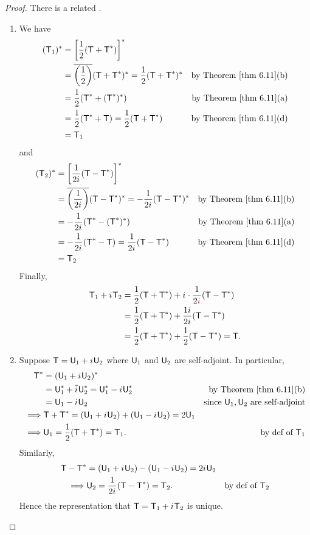 \begin{proof}
There is a related .
\begin{enumerate}
\item
We have
\begin{align*}
    (\T_1)^* & = \left[ \frac{1}{2}(\T + \T^*) \right]^* \\
        & = \conjugatet{\left(\frac{1}{2}\right)} (\T + \T^*)^* = \frac{1}{2} (\T + \T^*)^*& \text{by \THM{6.11}(b)} \\
        & = \frac{1}{2} (\T^* + (\T^*)^*) & \text{by \THM{6.11}(a)} \\
        & = \frac{1}{2} (\T^* + \T) = \frac{1}{2} (\T + \T^*) & \text{by \THM{6.11}(d)} \\
        & = \T_1
\end{align*}
and
\begin{align*}
    (\T_2)^* & = \left[ \frac{1}{2\iu}(\T - \T^*) \right]^* \\
        & = \conjugatet{\left(\frac{1}{2\iu}\right)} (\T - \T^*)^* = -\frac{1}{2\iu} (\T - \T^*)^*& \text{by \THM{6.11}(b)} \\
        & = -\frac{1}{2\iu} (\T^* - (\T^*)^*) & \text{by \THM{6.11}(a)} \\
        & = -\frac{1}{2\iu} (\T^* - \T) = \frac{1}{2\iu} (\T - \T^*) & \text{by \THM{6.11}(d)} \\
        & = \T_2
\end{align*}
Finally,
\begin{align*}
    \T_1 + \iu \T_2 & = \frac{1}{2}(\T + \T^*) + \iu \cdot \frac{1}{2\MAROON{\iu}} (\T - \T^*) \\
        & = \frac{1}{2}(\T + \T^*) + \frac{1\iu}{2\iu} (\T - \T^*) \\
        & =\frac{1}{2}(\T + \T^*) + \frac{1}{2} (\T - \T^*)
        = \T.
\end{align*}

\item Suppose \(\textsf{T} = \textsf{U}_1 + {i\mkern1mu} \textsf{U}_2\) where \(\textsf{U}_1\) and \(\textsf{U}_2\) are self-adjoint.
In particular,
\begin{align*}
    \T^* & = (\U_1 + \iu \U_2)^* \\
        & = \U_1^* + \conjugatet{\iu} \U_2^* = \U_1^* - \iu \U_2^* & \text{by \THM{6.11}(b)} \\
        & = \U_1 - \iu \U_2 & \text{since \(\U_1, \U_2\) are self-adjoint} \\
    \implies & \T + \T^* = (\U_1 + \iu \U_2) + (\U_1 - \iu \U_2) = 2 \U_1 \\
    \implies & \U_1 = \frac{1}{2} (\T + \T^*) = \T_1. & \text{by def of \(\T_1\)}
\end{align*}
Similarly,
\begin{align*}
    \textsf{T} - \textsf{T}^* & = (\textsf{U}_1 + {i\mkern1mu} \textsf{U}_2) - (\textsf{U}_1 - {i\mkern1mu} \textsf{U}_2) = 2{i\mkern1mu} \textsf{U}_2 \\
    \implies & \textsf{U}_2 = \frac{1}{2{i\mkern1mu}} (\textsf{T} - \textsf{T}^*) = \textsf{T}_2. & \text{by def of \(\textsf{T}_2\)}
\end{align*}
Hence the representation that \(\textsf{T} = \textsf{T}_1 + {i\mkern1mu} \textsf{T}_2\) is unique.


\end{enumerate}
\end{proof}
